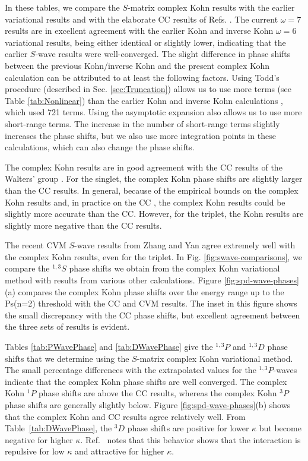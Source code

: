 \documentclass[preprint,showpacs,showkeys,preprintnumbers,amsmath,amssymb,longbibliography,pra,aps]{revtex4-1}
\begin{document}
{In these tables, we compare the $S$-matrix complex Kohn results with
the earlier variational 
results \cite{VanReeth2003,VanReeth2004} and with the elaborate CC results of 
Refs. \cite{Blackwood2002,Walters2004}. The current $\omega = 7$ results are 
in excellent agreement with the earlier Kohn and inverse Kohn $\omega = 6$ variational 
results, being either identical or slightly lower, indicating that the 
earlier $S$-wave results were well-converged. The slight difference in 
phase shifts between the previous Kohn/inverse Kohn and the
present complex Kohn calculation can be attributed 
to at least the following factors. Using Todd's procedure (described in Sec. \ref{sec:Truncation}) 
allows us to use more terms (see Table \ref{tab:Nonlinear}) than the earlier 
Kohn and inverse Kohn calculations \cite{VanReeth2003,VanReeth2004}, which used 721 terms. Using
the asymptotic expansion also allows us to use more short-range terms.
The increase in the number of short-range terms
slightly increases the phase shifts, but we also use more integration 
points in these calculations, which can also change the phase shifts. 

The complex Kohn results are in good agreement with the CC results of the 
Walters' group \cite{Blackwood2002,Walters2004}. For the singlet, the complex 
Kohn phase shifts are slightly larger than the CC results.
In general, because of the 
empirical bounds on the complex Kohn results and,
in practice on the CC \cite{Blackwood2002}, the complex Kohn results could be slightly 
more accurate than the CC. However, for the triplet,
the Kohn results are slightly more negative than the CC results.

The recent CVM $S$-wave results from Zhang and Yan \cite{Zhang2012} agree 
extremely well with the complex Kohn results, even for the triplet. In Fig.
\ref{fig:swave-comparisons},
we compare the $^{1,3}S$ phase shifts we obtain from 
the complex Kohn variational method with results from various other calculations. Figure 
\ref{fig:spd-wave-phases}(a) compares the complex Kohn phase shifts over the 
energy range up to the Ps(n=2) threshold with the CC and CVM results. The 
inset in this figure shows the small discrepancy with the CC phase shifts, 
but excellent agreement between the three sets of results is evident. 

Tables \ref{tab:PWavePhase} and \ref{tab:DWavePhase} give the $^{1,3}P$ and
$^{1,3}D$
phase shifts that we determine using the $S$-matrix complex Kohn variational 
method. The small percentage differences with the extrapolated values for the 
$^{1,3}P$-waves indicate that the complex Kohn phase shifts are well converged.
The complex Kohn $^1P$ phase shifts are above the CC
results, whereas the complex Kohn $^3P$ phase shifts are generally slightly below.
Figure \ref{fig:spd-wave-phases}(b) shows that the 
complex Kohn and CC results agree relatively well.
From Table~\ref{tab:DWavePhase}, the $^3D$ phase shifts are positive for
lower $\kappa$ but become negative for higher $\kappa$. 
Ref.~\cite{Blackwood2002} notes that this behavior shows that the interaction
is repulsive for low $\kappa$ and attractive for higher $\kappa$.

}
\end{document}
